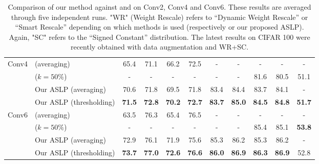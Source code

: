 \begin{table}[htbp]
{\begin{tabular}{@{}llcccccccc|c@{}}
    \multirow{4}{*}{Conv4} & \cite{DBLP:conf/nips/ZhouLLY19} (averaging)       & 65.4          & 71.1          & 66.2          & 72.5          & -             & -             & -             & -             &             -           \\
                            & \cite{DBLP:conf/cvpr/RamanujanWKFR20}\footnotemark[\value{footnote}] ($k=50\%$) &        -      &  -            &            -  &  -            &  -            &  -            & 81.6  &     80.5    &  51.1  \\ 
                            & Our ASLP (averaging)                                          & 70.6          & 71.8          & 69.5          & 71.8          & 83.4          & 84.4          & 83.7          & 84.1          &        -   \\
                            & Our ASLP (thresholding)                                      & \textbf{71.5}  & \textbf{72.8}& \textbf{70.2} & \textbf{72.7} & \textbf{83.7}& \textbf{85.0} & \textbf{84.5} & \textbf{84.8} &         \textbf{51.7}  \\
                            \midrule
    \multirow{4}{*}{Conv6} & \cite{DBLP:conf/nips/ZhouLLY19} (averaging)    & 63.5          & 76.3          & 65.4          & 76.5          & -             & -             & -             & -      &  -       \\
                            & \cite{DBLP:conf/cvpr/RamanujanWKFR20}\footnotemark[\value{footnote}] ($k=50\%$) &      -        &    -          &        -      &     -         &      -        &           -   &  85.4 &    85.1   &   \textbf{53.8}   \\ 
                            & Our ASLP (averaging)                                      & 72.9          & 76.1          & 71.9          & 75.6          & 85.3          & 86.2          & 85.3          & 86.2          &  - \\
                            & Our ASLP (thresholding)                                       & \textbf{73.7} &\textbf{77.0}  &\textbf{72.6}  &\textbf{76.6}  &\textbf{86.0}  &\textbf{86.9}  & \textbf{86.3} &\textbf{86.9}  &   52.8 \\
                            \bottomrule
    \end{tabular}
}

  \caption{Comparison of our method against \cite{DBLP:conf/nips/ZhouLLY19}
  and \cite{DBLP:conf/cvpr/RamanujanWKFR20} on Conv2, Conv4 and Conv6. These
  results are averaged through five independent runs. "WR" (Weight Rescale)
  refers to ``Dynamic Weight Rescale'' or ``Smart Rescale'' depending on which
  methods is used (respectively \cite{DBLP:conf/nips/ZhouLLY19} or our proposed
  ASLP). Again, "SC" refers to the ``Signed Constant'' distribution. The latest
  results on CIFAR 100 were recently obtained with data augmentation and WR+SC.}
  \label{tbl:conv_compare}

\end{table}

